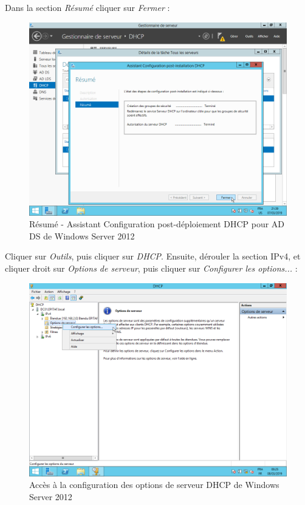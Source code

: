 \newpage
Dans la section \textit{Résumé} cliquer sur \textit{Fermer} :
\begin{figure}[h!]
    \begin{center}
        \includegraphics[scale=0.6]{WS2012_Screenshots/70.png}
        \caption{Résumé - Assistant Configuration post-déploiement DHCP pour AD DS de Windows Server 2012}
        \label{WS2012_Screenshots/70}
    \end{center}
\end{figure}
\FloatBarrier

\newpage
Cliquer sur \textit{Outils}, puis cliquer sur \textit{DHCP}. Ensuite, dérouler la section IPv4, et cliquer droit sur \textit{Options de serveur}, puis cliquer sur \textit{Configurer les options...} :
\begin{figure}[h!]
    \begin{center}
        \includegraphics[scale=0.6]{WS2012_Screenshots/71.png}
        \caption{Accès à la configuration des options de serveur DHCP de Windows Server 2012}
        \label{WS2012_Screenshots/71}
    \end{center}
\end{figure}
\FloatBarrier

